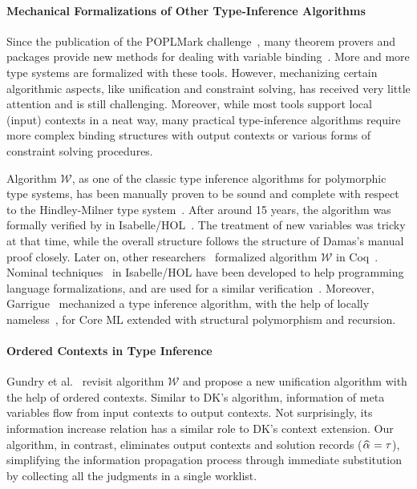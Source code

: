 \paragraph{Mechanical Formalizations of Other Type-Inference Algorithms}
Since the publication of the {\sc POPLMark} challenge~\cite{aydemir2005mechanized},
many theorem provers and packages provide new methods for dealing
with variable binding~\cite{aydemir2008engineering,urban2008nominalTech,chlipala2008parametric}.
More and more type systems are formalized with these tools.
However, mechanizing certain algorithmic aspects, like unification and
constraint solving, has received very little attention and is still challenging.
Moreover, while most tools support local (input) contexts in a neat way,
many practical type-inference algorithms require
more complex binding structures with output contexts or various forms of constraint solving procedures.

Algorithm $\mathcal{W}$,
as one of the classic type inference algorithms for polymorphic type systems,
has been manually proven to be sound and complete
with respect to the Hindley-Milner type system~\cite{hindley1969principal,milner1978theory,damas1982principal}.
After around 15 years, the algorithm was formally verified by
\citet{naraschewski1999type} in Isabelle/HOL~\cite{nipkow2002isabelle}.
The treatment of new variables was tricky at that time, while the overall structure follows the
structure of Damas's manual proof closely.
Later on, other researchers~\cite{dubois2000proving,dubois1999certification}
formalized algorithm $\mathcal{W}$ in Coq~\cite{Coq}.
Nominal techniques~\cite{urban2008nominalTech} in Isabelle/HOL have been
developed to help programming language formalizations, and are used for a similar
verification~\cite{urban2008nominal}. Moreover, Garrigue~\cite{garrigue2015certified}
mechanized a type inference algorithm,
with the help of locally nameless~\cite{LocallyNameless},
for Core ML extended with structural polymorphism and recursion.

\paragraph{Ordered Contexts in Type Inference}
Gundry et al.~\cite{gundry2010type} revisit algorithm $\mathcal{W}$ and
propose a new unification algorithm with the help of ordered contexts.
Similar to DK's algorithm, information of meta variables flow from input contexts to output contexts.
Not surprisingly, its information increase relation has a similar role to DK's context extension.
Our algorithm, in contrast,
eliminates output contexts and solution records ($\al = \tau$),
simplifying the information propagation process through immediate substitution
by collecting all the judgments in a single worklist.

